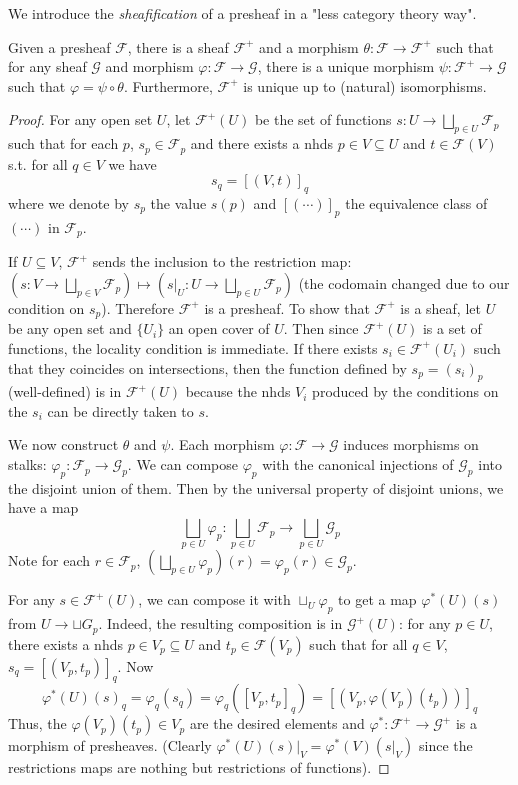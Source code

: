 \documentclass[12pt,letter]{article}
\begin{document}
	We introduce the \textit{sheafification} of a presheaf in a "less category theory way".
	\begin{theorem}[sheafification]\label{t121}
	Given a presheaf $\mathscr F$, there is a sheaf $\mathscr F^+$ and a morphism $\theta: \mathscr F\to \mathscr F^+$ such that for any sheaf $\mathscr G$ and morphism $\varphi:\mathscr F\to\mathscr G$, there is a unique morphism $\psi:\mathscr F^+\to \mathscr G$ such that $\varphi=\psi\circ\theta$. Furthermore, $\mathscr F^+$ is unique up to (natural) isomorphisms. 
	\end{theorem}
	\begin{proof}
	For any open set $U$, let $\mathscr F^+(U)$ be the set of functions $s:U\to \bigsqcup_{p\in U}\mathscr F_p$ such that for each $p$, $s_p\in \mathscr F_p$ and there exists a nhds $p\in V\subseteq U$ and $t\in\mathscr F(V)$ s.t. for all $q\in V$ we have
	\[s_q=[(V, t)]_q\]
	where we denote by $s_p$ the value $s(p)$ and $[(\cdots)]_p$ the equivalence class of $(\cdots)$ in $\mathscr F_p$.
	
	If $U\subseteq V$, $\mathscr F^+$ sends the inclusion to the restriction map: $(s:V\to \bigsqcup_{p\in V}\mathscr F_p)\mapsto (s|_U:U\to \bigsqcup_{p\in U}\mathscr F_p)$ (the codomain changed due to our condition on $s_p$). Therefore $\mathscr F^+$ is a presheaf. To show that $\mathscr F^+$ is a sheaf, let $U$ be any open set and $\{U_i\}$ an open cover of $U$. Then since $\mathscr F^+(U)$ is a set of functions, the locality condition is immediate. If there exists $s_i\in \mathscr F^+(U_i)$ such that they coincides on intersections, then the function defined by $s_p=(s_{i})_p$ (well-defined) is in $\mathscr F^+(U)$ because the nhds $V_i$ produced by the conditions on the $s_i$ can be directly taken to $s$.
	
	We now construct $\theta$ and $\psi$. Each morphism $\varphi: \mathscr F\to \mathscr G$ induces morphisms on stalks: $\varphi_p:\mathscr F_p\to \mathscr G_p$. We can compose $\varphi_p$ with the canonical injections of $\mathscr G_p$ into the disjoint union of them. Then by the universal property of disjoint unions, we have a map 
	\[\bigsqcup_{p\in U}\varphi_p:\bigsqcup_{p\in U}\mathscr F_p\to \bigsqcup_{p\in U}\mathscr G_p\]
	Note for each $r\in \mathscr F_p$, $\left(\bigsqcup_{p\in U}\varphi_p\right)(r)=\varphi_p(r)\in\mathscr G_p$.

	For any $s\in\mathscr F^+(U)$, we can compose it with $\sqcup_U\varphi_p$ to get a map $\varphi^*(U)(s)$ from $U\to \sqcup G_p$. Indeed, the resulting composition is in $\mathscr G^+(U)$: for any $p\in U$, there exists a nhds $p\in V_p\subseteq U$ and $t_p\in\mathscr F(V_p)$ such that for all $q\in V$, $s_q=[(V_p,t_p)]_q$. Now 
	\[\varphi^*(U)(s)_q=\varphi_q(s_q)=\varphi_q([V_p, t_p]_q)=[(V_p, \varphi(V_p)(t_p))]_q\]
	Thus, the $\varphi(V_p)(t_p)\in V_p$ are the desired elements and $\varphi^*:\mathscr F^+\to\mathscr G^+$ is a morphism of presheaves. (Clearly $\varphi^*(U)(s)|_V=\varphi^*(V)(s|_V)$ since the restrictions maps are nothing but restrictions of functions).
	

\end{proof}
\end{document}
